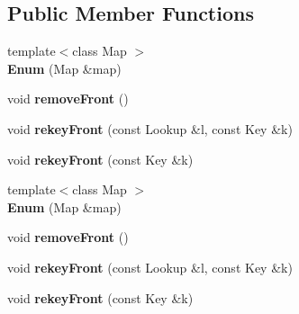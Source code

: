 \subsection*{Public Member Functions}
\begin{DoxyCompactItemize}
\item 
\hypertarget{classjs_1_1detail_1_1_hash_table_1_1_enum_ae5d3e67a6cadf691f5655a727dc517b7}{{\footnotesize template$<$class Map $>$ }\\{\bfseries Enum} (Map \&map)}\label{classjs_1_1detail_1_1_hash_table_1_1_enum_ae5d3e67a6cadf691f5655a727dc517b7}

\item 
\hypertarget{classjs_1_1detail_1_1_hash_table_1_1_enum_ada3ec342e3bb1c02d723fc431acae53a}{void {\bfseries remove\-Front} ()}\label{classjs_1_1detail_1_1_hash_table_1_1_enum_ada3ec342e3bb1c02d723fc431acae53a}

\item 
\hypertarget{classjs_1_1detail_1_1_hash_table_1_1_enum_a673a607feb57579c503b8e2589e8a3c2}{void {\bfseries rekey\-Front} (const Lookup \&l, const Key \&k)}\label{classjs_1_1detail_1_1_hash_table_1_1_enum_a673a607feb57579c503b8e2589e8a3c2}

\item 
\hypertarget{classjs_1_1detail_1_1_hash_table_1_1_enum_a9eb32d7a9b87102e84ef156030b4a896}{void {\bfseries rekey\-Front} (const Key \&k)}\label{classjs_1_1detail_1_1_hash_table_1_1_enum_a9eb32d7a9b87102e84ef156030b4a896}

\item 
\hypertarget{classjs_1_1detail_1_1_hash_table_1_1_enum_ae5d3e67a6cadf691f5655a727dc517b7}{{\footnotesize template$<$class Map $>$ }\\{\bfseries Enum} (Map \&map)}\label{classjs_1_1detail_1_1_hash_table_1_1_enum_ae5d3e67a6cadf691f5655a727dc517b7}

\item 
\hypertarget{classjs_1_1detail_1_1_hash_table_1_1_enum_ada3ec342e3bb1c02d723fc431acae53a}{void {\bfseries remove\-Front} ()}\label{classjs_1_1detail_1_1_hash_table_1_1_enum_ada3ec342e3bb1c02d723fc431acae53a}

\item 
\hypertarget{classjs_1_1detail_1_1_hash_table_1_1_enum_a673a607feb57579c503b8e2589e8a3c2}{void {\bfseries rekey\-Front} (const Lookup \&l, const Key \&k)}\label{classjs_1_1detail_1_1_hash_table_1_1_enum_a673a607feb57579c503b8e2589e8a3c2}

\item 
\hypertarget{classjs_1_1detail_1_1_hash_table_1_1_enum_a9eb32d7a9b87102e84ef156030b4a896}{void {\bfseries rekey\-Front} (const Key \&k)}\label{classjs_1_1detail_1_1_hash_table_1_1_enum_a9eb32d7a9b87102e84ef156030b4a896}

\end{DoxyCompactItemize}
